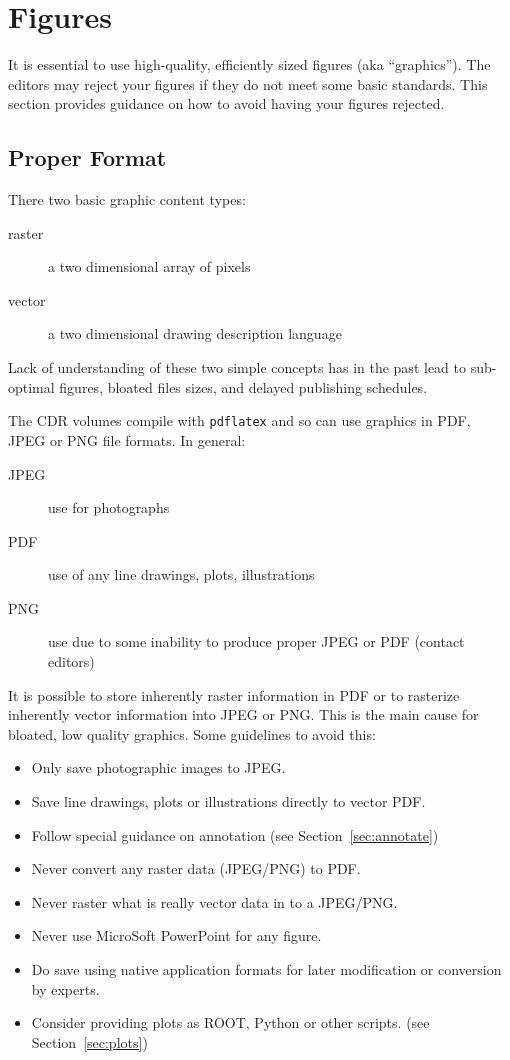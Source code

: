 \section{Figures}
\label{sec:figures}

It is essential to use high-quality, efficiently sized figures (aka ``graphics'').  The editors may reject your figures if they do not meet some basic standards.  This section provides guidance on how to avoid having your figures rejected.

\subsection{Proper Format}

There two basic graphic content types:

\begin{description}
\item[raster] a two dimensional array of pixels
\item[vector] a two dimensional drawing description language
\end{description}

Lack of understanding of these two simple concepts has in the past lead to sub-optimal figures, bloated files sizes, and delayed publishing schedules.  

The CDR volumes compile with \texttt{pdflatex} and so can use graphics in PDF, JPEG or PNG file formats.  In general:

\begin{description}
\item[JPEG] use for photographs
\item[PDF] use of any line drawings, plots, illustrations
\item[PNG] use due to some inability to produce proper JPEG or PDF (contact editors)
\end{description}

It is possible to store inherently raster information in PDF or to rasterize inherently vector information into JPEG or PNG.  This is the main cause for bloated, low quality graphics.  Some guidelines to avoid this:

\begin{itemize}
\item Only save photographic images to JPEG.
\item Save line drawings, plots or illustrations directly to vector PDF.
\item Follow special guidance on annotation (see Section~\ref{sec:annotate})
\item Never convert any raster data (JPEG/PNG) to PDF.
\item Never raster what is really vector data in to a JPEG/PNG.
\item Never use MicroSoft PowerPoint for any figure.
\item Do save using native application formats for later modification or conversion by experts.
\item Consider providing plots as ROOT, Python or other scripts.  (see Section~\ref{sec:plots})
\end{itemize}

